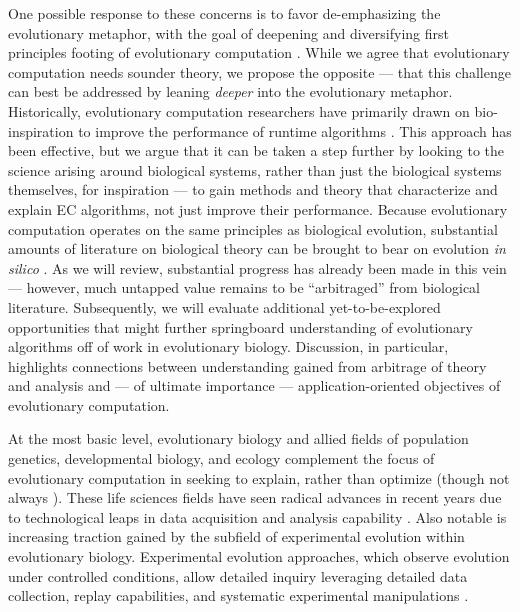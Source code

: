 One possible response to these concerns is to favor de-emphasizing the evolutionary metaphor, with the goal of deepening and diversifying first principles footing of evolutionary computation \citep{moore2023evolution}.
While we agree that evolutionary computation needs sounder theory, we propose the opposite --- that this challenge can best be addressed by leaning \textit{deeper} into the evolutionary metaphor.
Historically, evolutionary computation researchers have primarily drawn on bio-inspiration to improve the performance of runtime algorithms \citep{banzhaf2006artificial,kumar2003biologically,mcphee2009developmental}.
This approach has been effective, but we argue that it can be taken a step further by looking to the science arising around biological systems, rather than just the biological systems themselves, for inspiration --- to gain methods and theory that characterize and explain EC algorithms, not just improve their performance.
Because evolutionary computation operates on the same principles as biological evolution, substantial amounts of literature on biological theory can be brought to bear on evolution \textit{in silico} \citep{belew1996computation}.
As we will review, substantial progress has already been made in this vein --- however, much untapped value remains to be ``arbitraged'' from biological literature.
Subsequently, we will evaluate additional yet-to-be-explored opportunities that might further springboard understanding of evolutionary algorithms off of work in evolutionary biology.
Discussion, in particular, highlights connections between understanding gained from arbitrage of theory and analysis and --- of ultimate importance --- application-oriented objectives of evolutionary computation.

At the most basic level, evolutionary biology and allied fields of population genetics, developmental biology, and ecology complement the focus of evolutionary computation in seeking to explain, rather than optimize (though not always \citep{cobb2013directed,carroll2014applying}).
These life sciences fields have seen radical advances in recent years due to technological leaps in data acquisition and analysis capability \citep{math2018omics,deshpande2024evolution}.
Also notable is increasing traction gained by the subfield of experimental evolution within evolutionary biology.
Experimental evolution approaches, which observe evolution under controlled conditions, allow detailed inquiry leveraging detailed data collection, replay capabilities, and systematic experimental manipulations \citep{kawecki2012experimental}.

